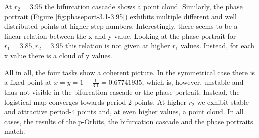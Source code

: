 At $r_2 = 3.95$ the bifurcation cascade shows a point cloud. Similarly, the phase portrait (Figure \ref{fig:phaseport-3.1-3.95}) exhibits multiple different and well distributed points at higher step numbers. 
Interestingly, there seems to be a linear relation between the x and y value. Looking at the phase portrait for $r_1 = 3.85, r_2=3.95$ this relation is not given at higher $r_1$ 
values. Instead, for each x value there is a cloud of y values.

All in all, the four tasks show a coherent picture. In the symmetrical case there is a fixed point at $x = y = 1 - \frac{1}{3.1} = 0.67741935 $, which is, however, unstable and thus 
not visible in the bifurcation cascade or the phase portrait. Instead, the logistical map converges towards period-2 points. At higher $r_2$ we exhibit stable and attractive 
period-4 points and, at even higher values, a point cloud. In all cases, the results of the p-Orbits, the bifurcation cascade and the phase portraits match.   